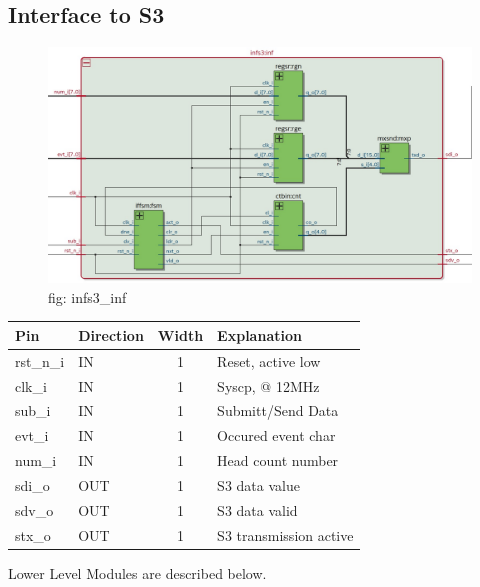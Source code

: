 \documentclass[12pt,a4 paper] {article}
\begin{document}
\subsection{Interface to S3}
\begin{figure}[h]
	\centering	
	\includegraphics[scale=0.3]{../png/infs3_inf.png}
	\newline
	fig: infs3\_inf\\
\end{figure}
\begin{center}
	\begin{tabular}{| p{2cm} | p{2cm} | c| p{4cm} |}
		\hline
		Pin & Direction & Width & Explanation\\
		\hline	
  		rst\_n\_i & IN & 1 & Reset, active low\\
  		\hline
		clk\_i   & IN  & 1 &  Syscp, @ 12MHz \\
		\hline
		sub\_i   & IN & 1 &   Submitt/Send Data \\
		\hline
		evt\_i   & IN  & 1 &  Occured event char \\
		\hline
		num\_i  &  IN & 1 & Head count number\\
		\hline
		sdi\_o   & OUT &1 & S3 data value\\
		\hline
		sdv\_o    & OUT&1 & S3 data valid\\
		\hline
		stx\_o   & OUT& 1& S3 transmission active\\
		\hline
	
		\end{tabular}
\end{center}
\newpage
Lower Level Modules are described below.\\
\end{document}
